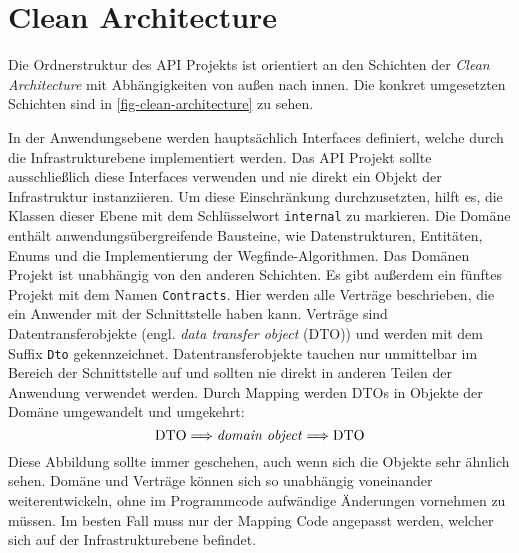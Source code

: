 \part{Clean Architecture}
Die Ordnerstruktur des API Projekts ist orientiert an den Schichten
der \textit{Clean Architecture}
mit Abhän\-gigkeiten von außen nach innen. Die konkret umgesetzten Schichten
sind in \autoref{fig-clean-architecture} zu sehen.



\noindent
In der Anwendungsebene werden hauptsächlich Interfaces definiert, welche
durch die Infrastrukturebene implementiert werden. Das API Projekt
sollte ausschließlich diese Interfaces verwenden und nie direkt
ein Objekt der Infrastruktur instanziieren.
Um diese Einschränkung durchzusetzten, hilft es,
die Klassen dieser Ebene mit dem Schlüsselwort \texttt{internal} zu markieren.
Die Domäne enthält anwendungsübergreifende Bausteine, wie
Datenstrukturen, Entitäten, Enums und die Implementierung der Wegfinde-Algorith\-men.
Das Domänen Projekt ist unabhängig von den anderen Schichten.
Es gibt außerdem ein fünftes Projekt mit dem Namen \texttt{Contracts}. Hier
werden alle Verträge beschrieben, die ein Anwender mit der Schnittstelle
haben kann. Verträge sind Datentransferobjekte (engl. \textit{data transfer object} (DTO))
und werden mit dem Suffix \texttt{Dto} gekennzeichnet. Datentransferobjekte
tauchen nur unmittelbar im Bereich der Schnittstelle auf und
sollten nie direkt in anderen Teilen der Anwendung verwendet werden.
Durch Mapping werden DTOs in Objekte der Domäne umgewandelt und umgekehrt:
\begin{equation*}
  \text{DTO} \Longrightarrow \text{\textit{domain object}} \Longrightarrow \text{DTO}
\end{equation*}
Diese Abbildung sollte immer geschehen, auch wenn sich die Objekte
sehr ähnlich sehen.
Domäne und Verträge können sich so unabhängig voneinander weiterentwickeln,
ohne im Programmcode aufwändige Änderungen vornehmen zu müssen.
Im besten Fall muss nur der Mapping Code angepasst werden,
welcher sich auf der Infrastrukturebene befindet.